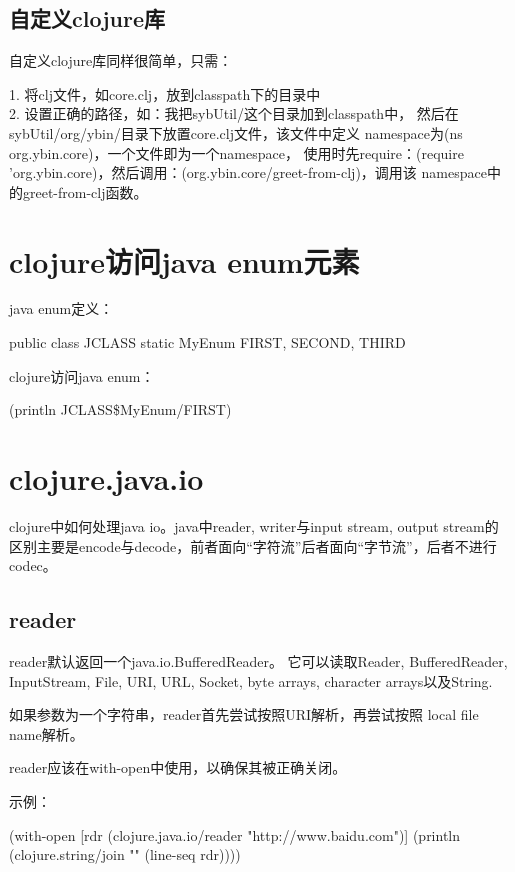 \documentclass[a4paper,11pt]{article}
\begin{document}
  \subsection[自定义clojure库]{自定义clojure库}
  自定义clojure库同样很简单，只需：

  1. 将clj文件，如core.clj，放到classpath下的目录中\\
  2. 设置正确的路径，如：我把sybUtil/这个目录加到classpath中，
  然后在sybUtil/org/ybin/目录下放置core.clj文件，该文件中定义
  namespace为(ns org.ybin.core)，一个文件即为一个namespace，
  使用时先require：(require 'org.ybin.core)，然后调用：(org.ybin.core/greet-from-clj)，调用该
  namespace中的greet-from-clj函数。

  \section[clojure访问java enum元素]{clojure访问java enum元素}
  java enum定义：\par
  \begin{javacode}
public class JCLASS {
  static MyEnum {
    FIRST,
    SECOND,
    THIRD
  }
}
  \end{javacode}

  clojure访问java enum：\par
(println JCLASS\$MyEnum/FIRST)


  \section[clojure.java.io]{clojure.java.io}
  clojure中如何处理java io。java中reader, writer与input stream, output stream的
  区别主要是encode与decode，前者面向“字符流”后者面向“字节流”，后者不进行codec。
  
  \subsection[reader]{reader}
  reader默认返回一个java.io.BufferedReader。
  它可以读取Reader, BufferedReader, InputStream, File,
  URI, URL, Socket, byte arrays, character arrays以及String.

  如果参数为一个字符串，reader首先尝试按照URI解析，再尝试按照
  local file name解析。

  reader应该在with-open中使用，以确保其被正确关闭。

  示例：\\
  \begin{schemecode}
    (with-open [rdr (clojure.java.io/reader "http://www.baidu.com")]
      (println (clojure.string/join "\n" (line-seq rdr))))
  \end{schemecode}
\end{document}
